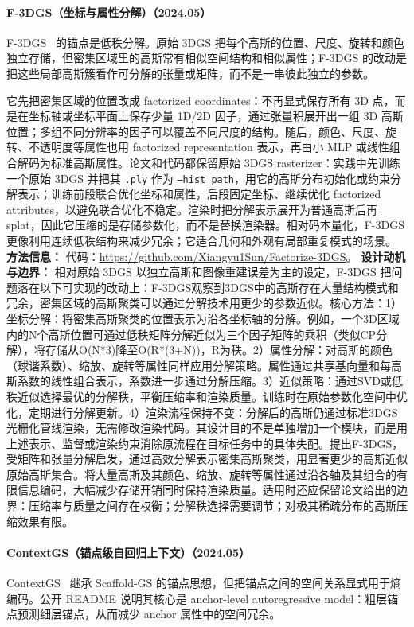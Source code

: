 \paragraph{F-3DGS（坐标与属性分解）（2024.05）}
F-3DGS~\cite{2405_17083} 的锚点是低秩分解。原始 3DGS 把每个高斯的位置、尺度、旋转和颜色独立存储，但密集区域里的高斯常有相似空间结构和相似属性；F-3DGS 的改动是把这些局部高斯簇看作可分解的张量或矩阵，而不是一串彼此独立的参数。

它先把密集区域的位置改成 factorized coordinates：不再显式保存所有 3D 点，而是在坐标轴或坐标平面上保存少量 1D/2D 因子，通过张量积展开出一组 3D 高斯位置；多组不同分辨率的因子可以覆盖不同尺度的结构。随后，颜色、尺度、旋转、不透明度等属性也用 factorized representation 表示，再由小 MLP 或线性组合解码为标准高斯属性。论文和代码都保留原始 3DGS rasterizer：实践中先训练一个原始 3DGS 并把其 \texttt{.ply} 作为 \texttt{--hist\_path}，用它的高斯分布初始化或约束分解表示；训练前段联合优化坐标和属性，后段固定坐标、继续优化 factorized attributes，以避免联合优化不稳定。渲染时把分解表示展开为普通高斯后再 splat，因此它压缩的是存储参数化，而不是替换渲染器。相对码本量化，F-3DGS 更像利用连续低秩结构来减少冗余；它适合几何和外观有局部重复模式的场景。
\textbf{方法信息：} 代码：\url{https://github.com/Xiangyu1Sun/Factorize-3DGS}。
\textbf{设计动机与边界：} 相对原始 3DGS 以独立高斯和图像重建误差为主的设定，F-3DGS 把问题落在以下可实现的改动上：F-3DGS观察到3DGS中的高斯存在大量结构模式和冗余，密集区域的高斯聚类可以通过分解技术用更少的参数近似。核心方法：1）坐标分解：将密集高斯聚类的位置表示为沿各坐标轴的分解。例如，一个3D区域内的N个高斯位置可通过低秩矩阵分解近似为三个因子矩阵的乘积（类似CP分解），将存储从O(N*3)降至O(R*(3+N))，R为秩。2）属性分解：对高斯的颜色（球谐系数）、缩放、旋转等属性同样应用分解策略。属性通过共享基向量和每高斯系数的线性组合表示，系数进一步通过分解压缩。3）近似策略：通过SVD或低秩近似选择最优的分解秩，平衡压缩率和渲染质量。训练时在原始参数化空间中优化，定期进行分解更新。4）渲染流程保持不变：分解后的高斯仍通过标准3DGS光栅化管线渲染，无需修改渲染代码。其设计目的不是单独增加一个模块，而是用上述表示、监督或渲染约束消除原流程在目标任务中的具体失配。提出F-3DGS，受矩阵和张量分解启发，通过高效分解表示密集高斯聚类，用显著更少的高斯近似原始高斯集合。将大量高斯及其颜色、缩放、旋转等属性通过沿各轴及其组合的有限信息编码，大幅减少存储开销同时保持渲染质量。适用时还应保留论文给出的边界：压缩率与质量之间存在权衡；分解秩选择需要调节；对极其稀疏分布的高斯压缩效果有限。
\paragraph{ContextGS（锚点级自回归上下文）（2024.05）}
ContextGS~\cite{2405_20721} 继承 Scaffold-GS 的锚点思想，但把锚点之间的空间关系显式用于熵编码。公开 README 说明其核心是 anchor-level autoregressive model：粗层锚点预测细层锚点，从而减少 anchor 属性中的空间冗余。

